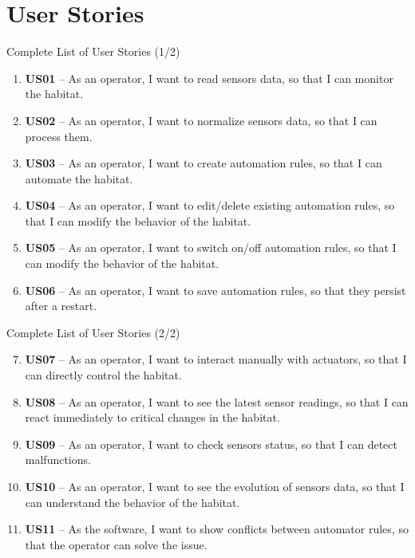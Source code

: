 \documentclass[aspectratio=169]{beamer}
\begin{document}
\section{User Stories}

\begin{frame}[t]{Complete List of User Stories (1/2)}
  \vspace{0.3cm}
  \begin{enumerate}
    \setlength{\itemsep}{1em} %
    \item \textbf{US01} -- As an operator, I want to read sensors data, so that I can monitor the habitat.
    \item \textbf{US02} -- As an operator, I want to normalize sensors data, so that I can process them.
    \item \textbf{US03} -- As an operator, I want to create automation rules, so that I can automate the habitat.
    \item \textbf{US04} -- As an operator, I want to edit/delete existing automation rules, so that I can modify the behavior of the habitat.
    \item \textbf{US05} -- As an operator, I want to switch on/off automation rules, so that I can modify the behavior of the habitat.
    \item \textbf{US06} -- As an operator, I want to save automation rules, so that they persist after a restart.
  \end{enumerate}
\end{frame}

\begin{frame}[t]{Complete List of User Stories (2/2)}
  \vspace{0.3cm}
  \begin{enumerate}
    \setcounter{enumi}{6} %
    \setlength{\itemsep}{1em}
      \item \textbf{US07} -- As an operator, I want to interact manually with actuators, so that I can directly control the habitat.
    \item \textbf{US08} -- As an operator, I want to see the latest sensor readings, so that I can react immediately to critical changes in the habitat.
    \item \textbf{US09} -- As an operator, I want to check sensors status, so that I can detect malfunctions.
    \item \textbf{US10} -- As an operator, I want to see the evolution of sensors data, so that I can understand the behavior of the habitat.
    \item \textbf{US11} -- As the software, I want to show conflicts between automator rules, so that the operator can solve the issue.
  \end{enumerate}
\end{frame}
\end{document}
